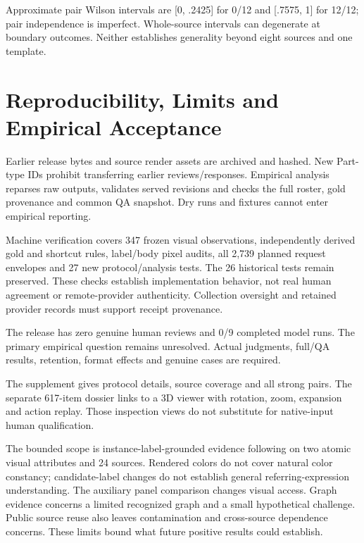 \documentclass[10pt,twocolumn,letterpaper]{article}
\begin{document}
Approximate pair Wilson intervals are [0, .2425] for 0/12 and
[.7575, 1] for 12/12; pair independence is imperfect.
Whole-source intervals can degenerate at boundary outcomes.
Neither establishes generality beyond eight sources and one template.

\section{Reproducibility, Limits and Empirical Acceptance}
Earlier release bytes and source render assets are archived and hashed.
New Part-type IDs prohibit transferring earlier reviews/responses.
Empirical analysis reparses raw outputs, validates served revisions
and checks the full roster, gold provenance and common QA snapshot.
Dry runs and fixtures cannot enter empirical reporting.

Machine verification covers 347 frozen visual observations, independently
derived gold and shortcut rules, label/body pixel audits, all 2,739 planned
request envelopes and 27 new protocol/analysis tests. The 26 historical
tests remain preserved. These checks establish implementation behavior,
not real human agreement or remote-provider authenticity. Collection
oversight and retained provider records must support receipt provenance.

The release has zero genuine human reviews and 0/9 completed model runs.
The primary empirical question remains unresolved. Actual judgments,
full/QA results, retention, format effects and genuine cases are required.

The supplement gives protocol details, source coverage and all strong
pairs. The separate 617-item dossier links to a 3D viewer with rotation,
zoom, expansion and action replay. Those inspection views do not
substitute for native-input human qualification.

The bounded scope is instance-label-grounded evidence following on
two atomic visual attributes and 24 sources. Rendered colors do not
cover natural color constancy; candidate-label changes do not establish
general referring-expression understanding. The auxiliary panel
comparison changes visual access. Graph evidence concerns a limited
recognized graph and a small hypothetical challenge. Public source
reuse also leaves contamination and cross-source dependence concerns.
These limits bound what future positive results could establish.

\clearpage
{\small


}
\end{document}
